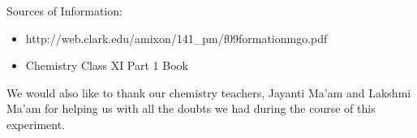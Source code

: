 Sources of Information:
\begin{itemize}
\item http://web.clark.edu/amixon/141\_pm/f09formationmgo.pdf
\item Chemistry Class XI Part 1 Book
  \end{itemize}

  We would also like to thank our chemistry teachers, Jayanti Ma'am and Lakshmi Ma'am for helping us with all the doubts we had during the course of this experiment.
  